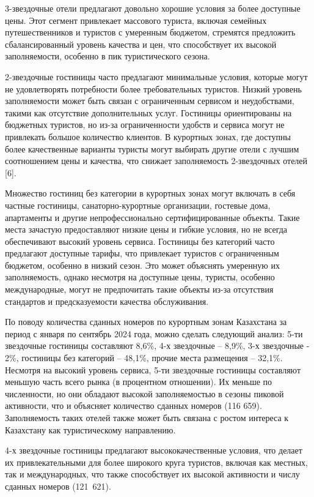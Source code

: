 \begin{multicols}{2}
3-звездочные отели предлагают довольно хорошие условия за более
доступные цены. Этот сегмент привлекает массового туриста, включая
семейных путешественников и туристов с умеренным бюджетом, стремятся
предложить сбалансированный уровень качества и цен, что способствует их
высокой заполняемости, особенно в пик туристического сезона.

2-звездочные гостиницы часто предлагают минимальные условия, которые
могут не удовлетворять потребности более требовательных туристов. Низкий
уровень заполняемости может быть связан с ограниченным сервисом и
неудобствами, такими как отсутствие дополнительных услуг. Гостиницы
ориентированы на бюджетных туристов, но из-за ограниченности удобств и
сервиса могут не привлекать большое количество клиентов. В курортных
зонах, где доступны более качественные варианты туристы могут выбирать
другие отели с лучшим соотношением цены и качества, что снижает
заполняемость 2-звездочных отелей {[}6{]}.

Множество гостиниц без категории в курортных зонах могут включать в себя
частные гостиницы, санаторно-курортные организации, гостевые дома,
апартаменты и другие непрофессионально сертифицированные объекты. Такие
места зачастую предоставляют низкие цены и гибкие условия, но не всегда
обеспечивают высокий уровень сервиса. Гостиницы без категорий часто
предлагают доступные тарифы, что привлекает туристов с ограниченным
бюджетом, особенно в низкий сезон. Это может объяснять умеренную их
заполняемость, однако несмотря на доступные цены, туристы, особенно
международные, могут не предпочитать такие объекты из-за отсутствия
стандартов и предсказуемости качества обслуживания.

По поводу количества сданных номеров по курортным зонам Казахстана за
период с января по сентябрь 2024 года, можно сделать следующий анализ:
5-ти звездочные гостиницы составляют 8,6\%, 4-х звездочные -- 8,9\%, 3-х
звездочные - 2\%, гостиницы без категорий -- 48,1\%, прочие места
размещения -- 32,1\%. Несмотря на высокий уровень сервиса, 5-ти
звездочные гостиницы составляют меньшую часть всего рынка (в процентном
отношении). Их меньше по численности, но они обладают высокой
заполняемостью в сезоны пиковой активности, что и объясняет количество
сданных номеров (116 659). Заполняемость таких отелей также может быть
связана с ростом интереса к Казахстану как туристическому направлению.

4-х звездочные гостиницы предлагают высококачественные условия, что
делает их привлекательными для более широкого круга туристов, включая
как местных, так и международных, что также способствует их высокой
активности и числу сданных номеров (121~621).


\end{multicols}
